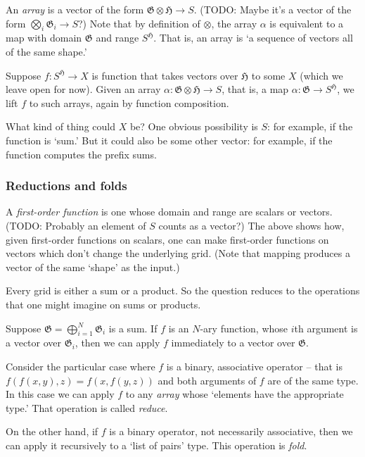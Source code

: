 \documentclass[11pt]{article}
\newcommand{\gr}[1]{\mathfrak{#1}}
\begin{document}
An \emph{array} is a vector of the form \(\gr{G}\otimes\gr{H}\to S\). (TODO: Maybe it's
a vector of the form \(\bigotimes_i \gr{G}_i\to S\)?) Note that by definition of
\(\otimes\), the array \(\alpha\) is equivalent to a map with domain \(\gr{G}\) and
range \(S^\gr{H}\). That is, an array is ‘a sequence of vectors all of the same
shape.’

Suppose \(f:S^\gr{H}\to X\) is function that takes vectors over \(\gr{H}\) to
some \(X\) (which we leave open for now). Given an array \(\alpha : \gr{G}\otimes
\gr{H}\to S\), that is, a map \(\alpha : \gr{G}\to S^\gr{H}\), we lift \(f\) to
such arrays, again by function composition.

What kind of thing could \(X\) be? One obvious possibility is \(S\): for example, if
the function is ‘sum.’ But it could also be some other vector: for example, if
the function computes the prefix sums. 

\subsubsection{Reductions and folds}
\label{sec:org1f2a8ac}

A  \emph{first-order  function}  is  one  whose  domain  and  range  are  scalars  or
vectors. (TODO: Probably an element of \(S\)  counts as a vector?) The above shows
how, given first-order functions on  scalars, one can make first-order functions
on vectors which don't change the underlying grid. (Note that mapping produces a
vector of the same `shape' as the input.)

Every grid is either a sum or a product. So the question reduces to the
operations that one might imagine on sums or products. 

Suppose \(\gr{G} = \bigoplus_{i = 1}^N \gr{G}_i\) is a sum. If \(f\) is an \(N\)-ary
function, whose \(i\)th argument is a vector over \(\gr{G}_i\), then we can apply
\(f\) immediately to a vector over \(\gr{G}\).

Consider the particular case where \(f\) is a binary, associative operator -- that
is \(f(f(x, y), z) = f(x, f(y, z))\) and both arguments of \(f\) are of the same
type. In this case we can apply \(f\) to any \emph{array} whose ‘elements have the
appropriate type.’ That operation is called \emph{reduce}.

On the other hand, if \(f\) is a binary operator, not necessarily associative,
then we can apply it recursively to a ‘list of pairs’ type. This operation is
\emph{fold}.
\end{document}
